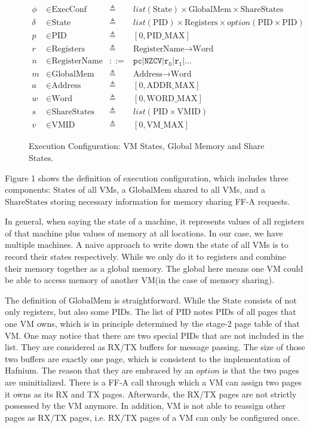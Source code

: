 \documentclass[a4paper]{article}
\newcommand*{\defined}{\triangleq}
\newcommand*{\maps}{\rightarrow}
\newcommand*{\derived}{::=}
\newcommand*{\CONF}{\text{ExecConf}}
\newcommand*{\STATE}{\text{State}}
\newcommand*{\MEM}{\text{GlobalMem}}
\newcommand*{\SSS}{\text{ShareStates}}
\newcommand*{\PID}{\text{PID}}
\newcommand*{\REGS}{\text{Registers}}
\newcommand*{\ADDR}{\text{Address}}
\newcommand*{\WORD}{\text{Word}}
\newcommand*{\VMID}{\text{VMID}}
\newcommand*{\REGNAMES}{\text{RegisterName}}
\newcommand*{\PAMAX}{\text{ADDR\_MAX}}
\newcommand*{\PPIDMAX}{\text{PID\_MAX}}
\newcommand*{\PWMAX}{\text{WORD\_MAX}}
\newcommand*{\PVMMAX}{\text{VM\_MAX}}
\begin{document}
\begin{figure}
  \begin{align*}
    \phi &\in \CONF &\defined &list(\STATE) \times \MEM \times \SSS \\
    \delta &\in \STATE &\defined &list(\PID) \times \REGS \times option(\PID \times \PID) \\
    p & \in \PID &\defined  &[ 0, \PPIDMAX ] \\
    r & \in \REGS &\defined  &\REGNAMES \maps \WORD \\
    n & \in \REGNAMES &\derived  &\mathtt{pc} | \mathtt{NZCV} | \mathtt {r_{0}} | \mathtt{r_{1}} | \dots \\
    m & \in \MEM &\defined  &\ADDR \maps \WORD \\
    a & \in \ADDR &\defined  &[ 0, \PAMAX ] \\
    w & \in \WORD &\defined  &[ 0, \PWMAX ] \\
    s & \in \SSS &\defined  &list(\PID \times \VMID) \\
    v & \in \VMID &\defined  &[ 0, \PVMMAX ]
  \end{align*}
  \caption{Execution Configuration: VM States, Global Memory and Share States.}
\end{figure}
Figure 1 shows the definition of execution configuration, which includes three
components: $\STATE$s of all VMs, a $\MEM$ shared to all VMs, and a $\SSS$
storing necessary information for memory sharing FF-A requests.

In general, when saying the state of a machine, it represents values of all
registers of that machine plus values of memory at all locations. In our case,
we have multiple machines. A naive approach to write down the state of all VMs
is to record their states respectively. While we only do it to registers and
combine their memory together as a global memory. The global here means one VM
could be able to access memory of another VM(in the case of memory sharing).

The definition of $\MEM$ is straightforward. While the $\STATE$ consists of not
only registers, but also some $\PID$s. The list of $\PID$ notes $\PID$s of all
pages that one VM owns, which is in principle determined by the stage-2 page
table of that VM. One may notice that there are two special $\PID$s that are not
included in the list. They are considered as RX/TX buffers for message passing.
The size of those two buffers are exactly one page, which is consistent to the
implementation of Hafnium. The reason that they are embraced by an $option$ is
that the two pages are uninitialized. There is a FF-A call through which a VM
can assign two pages it owns as its RX and TX pages. Afterwards, the RX/TX pages
are not strictly possessed by the VM anymore. In addition, VM is not able to
reassign other pages as RX/TX pages, i.e. RX/TX pages of a VM can only be
configured once.
\end{document}
